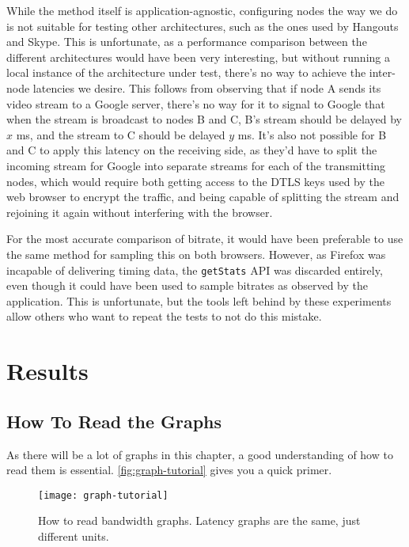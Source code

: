 While the method itself is application-agnostic, configuring nodes the way we do is not suitable for testing other architectures, such as the ones used by Hangouts and Skype. This is unfortunate, as a performance comparison between the different architectures would have been very interesting, but without running a local instance of the architecture under test, there's no way to achieve the inter-node latencies we desire. This follows from observing that if node A sends its video stream to a Google server, there's no way for it to signal to Google that when the stream is broadcast to nodes B and C, B's stream should be delayed by $x$ ms, and the stream to C should be delayed $y$ ms. It's also not possible for B and C to apply this latency on the receiving side, as they'd have to split the incoming stream for Google into separate streams for each of the transmitting nodes, which would require both getting access to the DTLS keys used by the web browser to encrypt the traffic, and being capable of splitting the stream and rejoining it again without interfering with the browser.

For the most accurate comparison of bitrate, it would have been preferable to use the same method for sampling this on both browsers. However, as Firefox was incapable of delivering timing data, the \texttt{getStats} API was discarded entirely, even though it could have been used to sample bitrates as observed by the application. This is unfortunate, but the tools left behind by these experiments allow others who want to repeat the tests to not do this mistake.


\section{Results}

\subsection{How To Read the Graphs}

As there will be a lot of graphs in this chapter, a good understanding of how to read them is essential. \autoref{fig:graph-tutorial} gives you a quick primer.

\begin{figure}
    \centering
    \texttt{[image: graph-tutorial]}
    \caption{How to read bandwidth graphs. Latency graphs are the same, just different units.}
    \label{fig:graph-tutorial}
\end{figure}

